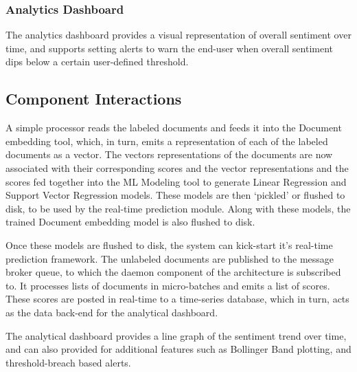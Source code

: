 \documentclass[conference]{IEEEtran}
\begin{document}
        \subsubsection{Analytics Dashboard}
            The analytics dashboard provides a visual representation of overall sentiment over time, and supports setting alerts to warn the end-user when overall sentiment dips below a certain user-defined threshold.

    \subsection{Component Interactions} \label{Component Interactions}
        A simple processor reads the labeled documents and feeds it into the Document embedding tool, which, in turn, emits a representation of each of the labeled documents as a vector.
        The vectors representations of the documents are now associated with their corresponding scores and the vector representations and the scores fed together into the ML Modeling tool to generate Linear Regression and Support Vector Regression models. 
        These models are then `pickled' or flushed to disk, to be used by the real-time prediction module. 
        Along with these models, the trained Document embedding model is also flushed to disk.

        Once these models are flushed to disk, the system can kick-start it's real-time prediction framework. 
        The unlabeled documents are published to the message broker queue, to which the daemon component of the architecture is subscribed to. 
        It processes lists of documents in micro-batches and emits a list of scores. 
        These scores are posted in real-time to a time-series database, which in turn, acts as the data back-end for the analytical dashboard.

        The analytical dashboard provides a line graph of the sentiment trend over time, and can also provided for additional features such as Bollinger Band plotting, and threshold-breach based alerts.

\vspace{5mm}
\end{document}
